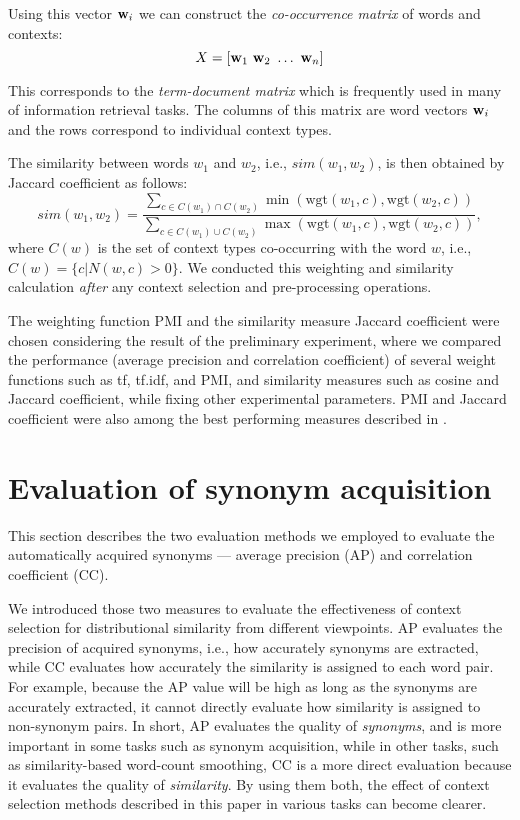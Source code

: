 \documentclass[english]{jnlp_1.4}
\begin{document}
Using this vector ${\bf w}_i$ we can construct the {\em co-occurrence
matrix} of words and contexts:
\[
   X = [{\bf w}_1\ {\bf w}_2\ \ldots \  {\bf w}_n]
\]

This corresponds to the {\em term-document matrix} which is frequently
used in many of information retrieval tasks. The columns of this
matrix are word vectors ${\bf w}_i$ and the rows correspond to
individual context types.

The similarity between words $w_1$ and $w_2$, i.e., $sim(w_1, w_2)$,
is then obtained by Jaccard coefficient as follows:
\[
 sim(w_1, w_2) = \frac{\sum_{c \in C(w_1)\cap C(w_2)} \min(\mbox{wgt}(w_1, c), \mbox{wgt}(w_2, c))}{\sum_{c \in C(w_1)\cup C(w_2)}\max(\mbox{wgt}(w_1, c), \mbox{wgt}(w_2, c))},
\]
where $C(w)$ is the set of context types co-occurring with the word
$w$, i.e., $C(w) = \{c|N(w,c) > 0\}$. We conducted this weighting and
similarity calculation {\em after} any context selection and
pre-processing operations.


The weighting function PMI and the similarity measure Jaccard
coefficient were chosen considering the result of the preliminary
experiment, where we compared the performance (average precision and
correlation coefficient) of several weight functions such as tf,
tf.idf, and PMI, and similarity measures such as cosine and Jaccard
coefficient, while fixing other experimental parameters. PMI and
Jaccard coefficient were also among the best performing measures
described in {\cite{Curran:02:improvements}}.


\section{Evaluation of synonym acquisition}

This section describes the two evaluation methods we employed to
evaluate the automatically acquired synonyms --- average precision
(AP) and correlation coefficient (CC).


We introduced those two measures to evaluate the effectiveness of
context selection for distributional similarity from different
viewpoints. AP evaluates the precision of acquired synonyms, i.e., how
accurately synonyms are extracted, while CC evaluates how accurately
the similarity is assigned to each word pair. For example, because the
AP value will be high as long as the synonyms are accurately
extracted, it cannot directly evaluate how similarity is assigned to
non-synonym pairs. In short, AP evaluates the quality of {\em
synonyms}, and is more important in some tasks such as synonym
acquisition, while in other tasks, such as similarity-based word-count
smoothing, CC is a more direct evaluation because it evaluates the
quality of {\em similarity}. By using them both, the effect of context
selection methods described in this paper in various tasks can become
clearer.
\end{document}
